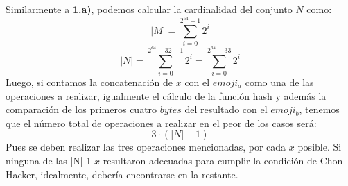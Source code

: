 \documentclass[14pt]{article}
\begin{document}
\begin{enumerate}[label=\alph*)]
  Similarmente a \textbf{1.a)}, podemos calcular la cardinalidad del conjunto $N$ como:
  \begin{equation}
    |M| = \sum_{i = 0}^{2^{64} - 1} 2^i
  \end{equation}
  \begin{equation}
    |N| = \sum_{i = 0}^{2^{64}-32-1}2^i = \sum_{i = 0}^{2^{64}-33}2^i
  \end{equation}
  Luego, si contamos la concatenación de $x$ con el $emoji_a$ como una de las operaciones a realizar, igualmente el cálculo de la función hash y además la comparación de los primeros cuatro $bytes$
  del resultado con el $emoji_b$, tenemos que el número total de operaciones a realizar en el
  peor de los casos será:
  \begin{equation}
    3 \cdot (|N| - 1)
  \end{equation}
  Pues se deben realizar las tres operaciones mencionadas, por cada $x$ posible. Si ninguna de
  las |N|-1 $x$ resultaron adecuadas para cumplir la condición de Chon Hacker, idealmente, debería
  encontrarse en la restante.\\
  

\end{enumerate}
\end{document}
